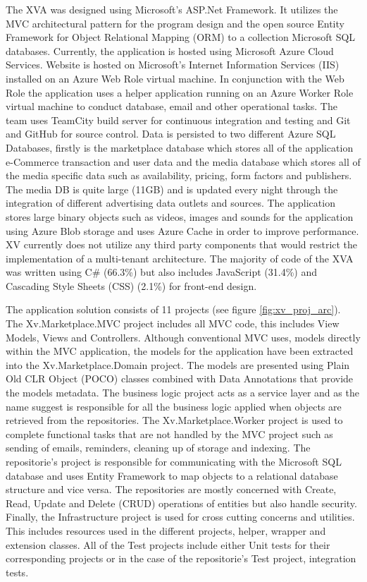 The XVA was designed using Microsoft's ASP.Net Framework. It utilizes the MVC architectural pattern for the program design and the open source Entity Framework for Object Relational Mapping (ORM) to a collection Microsoft SQL databases. Currently, the application is hosted using Microsoft Azure Cloud Services. Website is hosted on Microsoft's Internet Information Services (IIS) installed on an Azure Web Role virtual machine. In conjunction with the Web Role the application uses a helper application running on an Azure Worker Role virtual machine to conduct database, email and other operational tasks. The team uses TeamCity build server for continuous integration and testing and Git and GitHub for source control. Data is persisted to two different Azure SQL Databases, firstly is the marketplace database which stores all of the application e-Commerce transaction and user data and the media database which stores all of the media specific data such as availability, pricing, form factors and publishers. The media DB is quite large (11GB) and is updated every night through the integration of different advertising data outlets and sources. The application stores large binary objects such as videos, images and sounds for the application using Azure Blob storage and uses Azure Cache in order to improve performance. XV currently does not utilize any third party components that would restrict the implementation of a multi-tenant architecture. The majority of code of the XVA was written using C\# (66.3\%) but also includes JavaScript (31.4\%) and Cascading Style Sheets (CSS) (2.1\%) for front-end design.

The application solution consists of 11 projects (see figure \ref{fig:xv_proj_arc}). The Xv.Marketplace.MVC project includes all MVC code, this includes View Models, Views and Controllers. Although conventional MVC uses, models directly within the MVC application, the models for the application have been extracted into the Xv.Marketplace.Domain project. The models are presented using Plain Old CLR Object (POCO) classes combined with Data Annotations that provide the models metadata. The business logic project acts as a service layer and as the name suggest is responsible for all the business logic applied when objects are retrieved from the repositories. The Xv.Marketplace.Worker project is used to complete functional tasks that are not handled by the MVC project such as sending of emails, reminders, cleaning up of storage and indexing. The repositorie's project is responsible for communicating with the Microsoft SQL database and uses Entity Framework to map objects to a relational database structure and vice versa. The repositories are mostly concerned with Create, Read, Update and Delete (CRUD) operations of entities but also handle security. Finally, the Infrastructure project is used for cross cutting concerns and utilities. This includes resources used in the different projects, helper, wrapper and extension classes. All of the Test projects include either Unit tests for their corresponding projects or in the case of the repositorie's Test project, integration tests.


